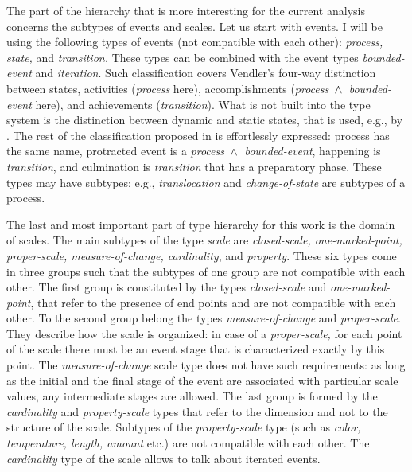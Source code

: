The part of the hierarchy that is more interesting for the current analysis concerns the subtypes of events and scales. Let us start with events. I will be using the following types of events (not compatible with each other): \textit{process, state,} and \textit{transition.} These types can be combined with the event types \textit{bounded-event} and \textit{iteration}. Such classification covers Vendler's \citep{Vendler:67} four-way distinction between states, activities (\textit{process} here), accomplishments (\textit{process $\,\wedge\,$ bounded-event} here), and achievements (\textit{transition}). What is not built into the type system is the distinction between dynamic and static states, that is used, e.g., by \citet{Bach:86}. The rest of the classification proposed in \citealt{Bach:86} is effortlessly expressed: process has the same name, protracted event is a \textit{process $\,\wedge\,$ bounded-event}, happening is \textit{transition}, and culmination is \textit{transition} that has a preparatory phase. These types may have subtypes: e.g., \textit{translocation} and \textit{change-of-state} are subtypes of a process.

The last and most important part of type hierarchy for this work is the domain of scales. The main subtypes of the type \textit{scale} are \textit{closed-scale, one-marked-point, proper-scale, measure-of-change, cardinality}, and \textit{property}. These six types come in three groups such that the subtypes of one group are not compatible with each other. The first group is constituted by the types \textit{closed-scale} and \textit{one-marked-point}, that refer to the presence of end points and are not compatible with each other. To the second group belong the types \textit{measure-of-change} and \textit{proper-scale}. They describe how the scale is organized: in case of a \textit{proper-scale,} for each point of the scale there must be an event stage that is characterized exactly by this point. The \textit{measure-of-change} scale type does not have such requirements: as long as the initial and the final stage of the event are associated with particular scale values, any intermediate stages are allowed. The last group is formed by the \textit{cardinality} and \textit{property-scale} types that refer to the dimension and not to the structure of the scale. Subtypes of the \textit{property-scale} type (such as \textit{color, temperature, length, amount} etc.) are not compatible with each other. The \textit{cardinality} type of the scale allows to talk about iterated events.

